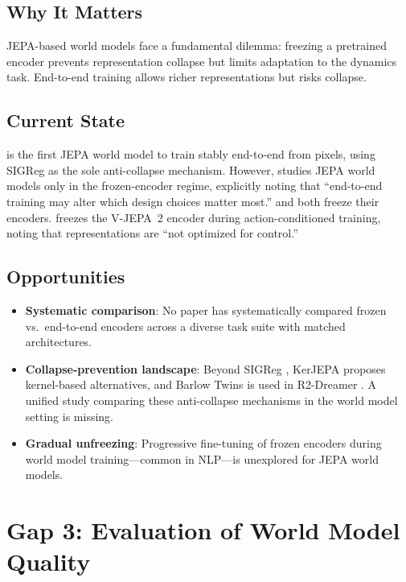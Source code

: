 \documentclass[11pt,a4paper]{article}
\begin{document}
\subsection{Why It Matters}
JEPA-based world models face a fundamental dilemma: freezing a pretrained encoder prevents representation collapse but limits adaptation to the dynamics task. End-to-end training allows richer representations but risks collapse.

\subsection{Current State}
\citet{maes2026leworldmodel} is the first JEPA world model to train stably end-to-end from pixels, using SIGReg \citep{balestriero2025lejepa} as the sole anti-collapse mechanism. However, \citet{terver2025drives} studies JEPA world models only in the frozen-encoder regime, explicitly noting that ``end-to-end training may alter which design choices matter most.'' \citet{nam2026causaljepa} and \citet{garrido2026learning} both freeze their encoders. \citet{assran2025vjepa2} freezes the V-JEPA~2 encoder during action-conditioned training, noting that representations are ``not optimized for control.''

\subsection{Opportunities}
\begin{itemize}[noitemsep]
    \item \textbf{Systematic comparison}: No paper has systematically compared frozen vs.\ end-to-end encoders across a diverse task suite with matched architectures.
    \item \textbf{Collapse-prevention landscape}: Beyond SIGReg \citep{balestriero2025lejepa}, KerJEPA \citep{zimmermann2025kerjepa} proposes kernel-based alternatives, and Barlow Twins is used in R2-Dreamer \citep{morihira2026r2dreamer}. A unified study comparing these anti-collapse mechanisms in the world model setting is missing.
    \item \textbf{Gradual unfreezing}: Progressive fine-tuning of frozen encoders during world model training---common in NLP---is unexplored for JEPA world models.
\end{itemize}

\section{Gap 3: Evaluation of World Model Quality}
\end{document}
